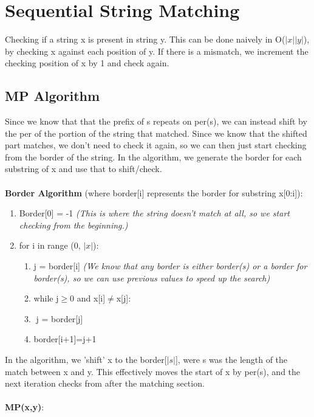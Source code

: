 \section{Sequential String Matching}
Checking if a string x is present in string y. This can be done naively in O($|x||y|$), by checking x against each position of y. If there is a mismatch, we increment the checking position of x by 1 and check again.


\subsection{MP Algorithm}
Since we know that that the prefix of s repeats on per(s), we can instead shift by the per of the portion of the string that matched. Since we know that the shifted part matches, we don't need to check it again, so we can then just start checking from the border of the string. In the algorithm, we generate the border for each substring of x and use that to shift/check.\\ \\
\textbf{Border Algorithm} (where border[i] represents the border for substring x[0:i]):
\begin{enumerate}[label=\Alph*]
    \item Border[0] = -1 \emph{(This is where the string doesn't match at all, so we start checking from the beginning.)}
    \item for i in range (0, $|x|$):
\begin{enumerate}[label=\arabic*]
    \item j = border[i] \emph{(We know that any border is either border(s) or a border for border(s), so we can use previous values to speed up the search)}
    \item while j$\geq0$ and x[i]$\neq$x[j]: 
    \item[ ] $\;$j = border[j]    
    \item border[i+1]=j+1 
\end{enumerate}    
\end{enumerate}
In the algorithm, we 'shift' x to the border[$|s|$], were s was the length of the match between x and y. This effectively moves the start of x by per(s), and the next iteration checks from after the matching section. \\ \\
\textbf{MP(x,y)}:
